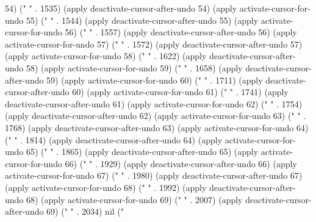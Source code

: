 54) (" " . 1535) (apply deactivate-cursor-after-undo 54) (apply activate-cursor-for-undo 55) (" " . 1544) (apply deactivate-cursor-after-undo 55) (apply activate-cursor-for-undo 56) (" " . 1557) (apply deactivate-cursor-after-undo 56) (apply activate-cursor-for-undo 57) (" " . 1572) (apply deactivate-cursor-after-undo 57) (apply activate-cursor-for-undo 58) (" " . 1622) (apply deactivate-cursor-after-undo 58) (apply activate-cursor-for-undo 59) (" " . 1658) (apply deactivate-cursor-after-undo 59) (apply activate-cursor-for-undo 60) (" " . 1711) (apply deactivate-cursor-after-undo 60) (apply activate-cursor-for-undo 61) (" " . 1741) (apply deactivate-cursor-after-undo 61) (apply activate-cursor-for-undo 62) (" " . 1754) (apply deactivate-cursor-after-undo 62) (apply activate-cursor-for-undo 63) (" " . 1768) (apply deactivate-cursor-after-undo 63) (apply activate-cursor-for-undo 64) (" " . 1814) (apply deactivate-cursor-after-undo 64) (apply activate-cursor-for-undo 65) (" " . 1865) (apply deactivate-cursor-after-undo 65) (apply activate-cursor-for-undo 66) (" " . 1929) (apply deactivate-cursor-after-undo 66) (apply activate-cursor-for-undo 67) (" " . 1980) (apply deactivate-cursor-after-undo 67) (apply activate-cursor-for-undo 68) (" " . 1992) (apply deactivate-cursor-after-undo 68) (apply activate-cursor-for-undo 69) (" " . 2007) (apply deactivate-cursor-after-undo 69) (" " . 2034) nil ("
